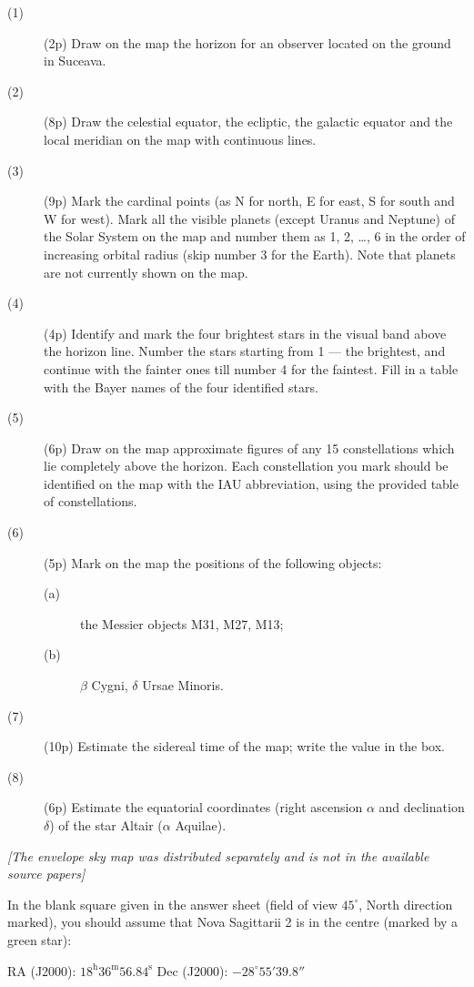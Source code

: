 \begin{description}
\item[(1)] (2p) Draw on the map the horizon for an observer located on the
  ground in Suceava.
\item[(2)] (8p) Draw the celestial equator, the ecliptic, the galactic
  equator and the local meridian on the map with continuous lines.
\item[(3)] (9p) Mark the cardinal points (as N for north, E for east, S for
  south and W for west). Mark all the visible planets (except Uranus and
  Neptune) of the Solar System on the map and number them as 1, 2, \ldots,
  6 in the order of increasing orbital radius (skip number 3 for the Earth).
  Note that planets are not currently shown on the map.
\item[(4)] (4p) Identify and mark the four brightest stars in the visual
  band above the horizon line. Number the stars starting from 1 --- the
  brightest, and continue with the fainter ones till number 4 for the
  faintest. Fill in a table with the Bayer names of the four identified
  stars.
\item[(5)] (6p) Draw on the map approximate figures of any 15 constellations
  which lie completely above the horizon. Each constellation you mark should
  be identified on the map with the IAU abbreviation, using the provided
  table of constellations.
\item[(6)] (5p) Mark on the map the positions of the following objects:
  \begin{description}
  \item[(a)] the Messier objects M31, M27, M13;
  \item[(b)] $\beta$ Cygni, $\delta$ Ursae Minoris.
  \end{description}
\item[(7)] (10p) Estimate the sidereal time of the map; write the value in
  the box.
\item[(8)] (6p) Estimate the equatorial coordinates (right ascension
  $\alpha$ and declination $\delta$) of the star Altair ($\alpha$ Aquilae).
\end{description}

\textit{[The envelope sky map was distributed separately and is not in the available source papers]}

In the blank square given in the answer sheet (field of view $45^\circ$,
North direction marked), you should assume that Nova Sagittarii 2 is in the
centre (marked by a green star):
\begin{center}
RA (J2000): $18^{\mathrm{h}} 36^{\mathrm{m}} 56.84^{\mathrm{s}}$ \qquad
Dec (J2000): $-28^\circ 55' 39.8''$
\end{center}

